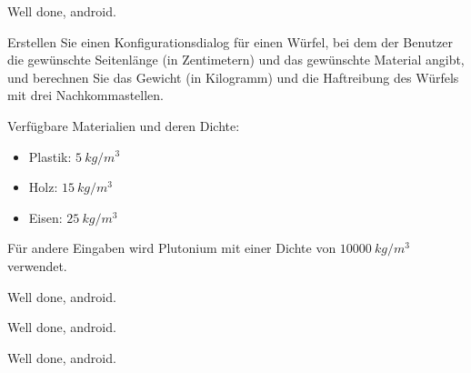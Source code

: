 \begin{frame}[fragile]{Well done, android.}\onslide<+->%
    \begin{exercise}
        Erstellen Sie einen Konfigurationsdialog für einen Würfel, bei dem der Benutzer die gewünschte Seitenlänge (in Zentimetern) und das gewünschte Material angibt, und berechnen Sie das Gewicht (in Kilogramm) und die Haftreibung des Würfels mit drei Nachkommastellen.
        \par\medskip
        Verfügbare Materialien und deren Dichte:\begin{itemize}
            \item Plastik: $5~kg/m^3$
            \item Holz: $15~kg/m^3$
            \item Eisen: $25~kg/m^3$
        \end{itemize}
        Für andere Eingaben wird Plutonium mit einer Dichte von $10000~kg/m^3$ verwendet.
    \end{exercise}
\end{frame}
\begin{frame}[fragile]{Well done, android.}\onslide<+->%
    \begin{solve}
        \scriptsize%
        \vspace{-\abovedisplayskip}
    \end{solve}
\end{frame}
\resetsolve
\begin{frame}[fragile]{Well done, android.}\onslide<+->%
    \begin{solve}
        \scriptsize%
    \end{solve}
    \vspace{-1em}
\end{frame}
\resetsolve
\begin{frame}[fragile]{Well done, android.}\onslide<+->%
    \begin{solve}
        \scriptsize%
    \end{solve}
\end{frame}
\resetsolve
